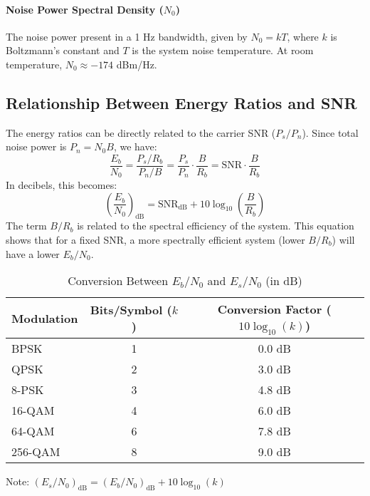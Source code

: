 \paragraph{Noise Power Spectral Density ($N_0$)}
The noise power present in a 1 Hz bandwidth, given by $N_0 = kT$, where $k$ is Boltzmann's constant and $T$ is the system noise temperature. At room temperature, $N_0 \approx -174$ dBm/Hz.

\subsection{Relationship Between Energy Ratios and SNR}

The energy ratios can be directly related to the carrier SNR ($P_s/P_n$). Since total noise power is $P_n = N_0 B$, we have:
\begin{equation}
    \frac{E_b}{N_0} = \frac{P_s/R_b}{P_n/B} = \frac{P_s}{P_n} \cdot \frac{B}{R_b} = \text{SNR} \cdot \frac{B}{R_b}
\end{equation}
In decibels, this becomes:
\begin{equation}
    \left(\frac{E_b}{N_0}\right)_{\text{dB}} = \text{SNR}_{\text{dB}} + 10\log_{10}\left(\frac{B}{R_b}\right)
\end{equation}
The term $B/R_b$ is related to the spectral efficiency of the system. This equation shows that for a fixed SNR, a more spectrally efficient system (lower $B/R_b$) will have a lower $E_b/N_0$.

\begin{table}[H]
    \centering
    \caption{Conversion Between $E_b/N_0$ and $E_s/N_0$ (in dB)}
    \label{tab:ebno-esno-conversion}
    \begin{tabular}{@{}lcc@{}}
        \toprule
        \tableheaderfont Modulation & \tableheaderfont Bits/Symbol ($k$) & \tableheaderfont Conversion Factor ($10\log_{10}(k)$) \\
        \midrule
        BPSK & 1 & 0.0 dB \\
        QPSK & 2 & 3.0 dB \\
        8-PSK & 3 & 4.8 dB \\
        16-QAM & 4 & 6.0 dB \\
        64-QAM & 6 & 7.8 dB \\
        256-QAM & 8 & 9.0 dB \\
        \bottomrule
    \end{tabular}
    \par\vspace{0.5em}
    \small Note: $\left(E_s/N_0\right)_{\text{dB}} = \left(E_b/N_0\right)_{\text{dB}} + 10\log_{10}(k)$
\end{table}


